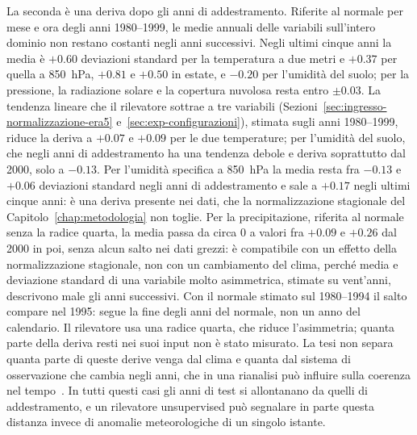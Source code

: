 La seconda è una deriva dopo gli anni di addestramento. Riferite al normale per mese e ora degli anni 1980--1999, le medie annuali delle variabili sull'intero dominio non restano costanti negli anni successivi. Negli ultimi cinque anni la media è $+0.60$ deviazioni standard per la temperatura a due metri e $+0.37$ per quella a 850~hPa, $+0.81$ e $+0.50$ in estate, e $-0.20$ per l'umidità del suolo; per la pressione, la radiazione solare e la copertura nuvolosa resta entro $\pm0.03$. La tendenza lineare che il rilevatore sottrae a tre variabili (Sezioni~\ref{sec:ingresso-normalizzazione-era5} e~\ref{sec:exp-configurazioni}), stimata sugli anni 1980--1999, riduce la deriva a $+0.07$ e $+0.09$ per le due temperature; per l'umidità del suolo, che negli anni di addestramento ha una tendenza debole e deriva soprattutto dal 2000, solo a $-0.13$. Per l'umidità specifica a 850~hPa la media resta fra $-0.13$ e $+0.06$ deviazioni standard negli anni di addestramento e sale a $+0.17$ negli ultimi cinque anni: è una deriva presente nei dati, che la normalizzazione stagionale del Capitolo~\ref{chap:metodologia} non toglie. Per la precipitazione, riferita al normale senza la radice quarta, la media passa da circa 0 a valori fra $+0.09$ e $+0.26$ dal 2000 in poi, senza alcun salto nei dati grezzi: è compatibile con un effetto della normalizzazione stagionale, non con un cambiamento del clima, perché media e deviazione standard di una variabile molto asimmetrica, stimate su vent'anni, descrivono male gli anni successivi. Con il normale stimato sul 1980--1994 il salto compare nel 1995: segue la fine degli anni del normale, non un anno del calendario. Il rilevatore usa una radice quarta, che riduce l'asimmetria; quanta parte della deriva resti nei suoi input non è stato misurato.
La tesi non separa quanta parte di queste derive venga dal clima e quanta dal sistema di osservazione che cambia negli anni, che in una rianalisi può influire sulla coerenza nel tempo~\cite{hersbach2020era5}. In tutti questi casi gli anni di test si allontanano da quelli di addestramento, e un rilevatore unsupervised può segnalare in parte questa distanza invece di anomalie meteorologiche di un singolo istante.

